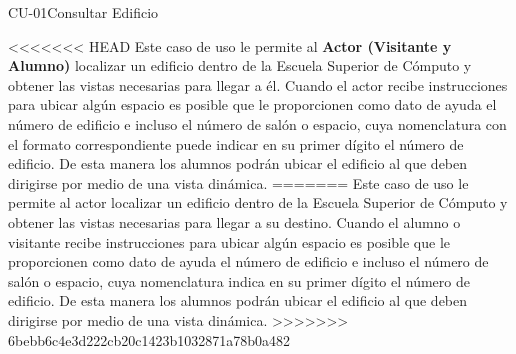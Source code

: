 \begin{UseCase}{CU-01}{Consultar Edificio}
    {
<<<<<<< HEAD
	Este caso de uso le permite al \textbf{Actor (Visitante y Alumno)} localizar un edificio dentro de la Escuela Superior de Cómputo y obtener las vistas necesarias para llegar a él. 
	Cuando el actor recibe instrucciones para ubicar algún espacio es posible que le proporcionen como dato de ayuda el número de edificio e incluso el número de salón o espacio, cuya nomenclatura con el formato correspondiente puede indicar en su primer dígito el número de edificio. De esta manera los alumnos podrán ubicar el edificio al que deben dirigirse por medio de una vista dinámica. 
=======
	Este caso de uso le permite al actor localizar un edificio dentro de la Escuela Superior de Cómputo y obtener las vistas necesarias para llegar a su destino. 
	Cuando el alumno o visitante recibe instrucciones para ubicar algún espacio es posible que le proporcionen como dato de ayuda el número de edificio e incluso el número de salón o espacio, cuya nomenclatura indica en su primer dígito el número de edificio. De esta manera los alumnos podrán ubicar el edificio al que deben dirigirse por medio de una vista dinámica. 
>>>>>>> 6bebb6c4e3d222cb20c1423b1032871a78b0a482
	
    }


%			


\end{UseCase}
